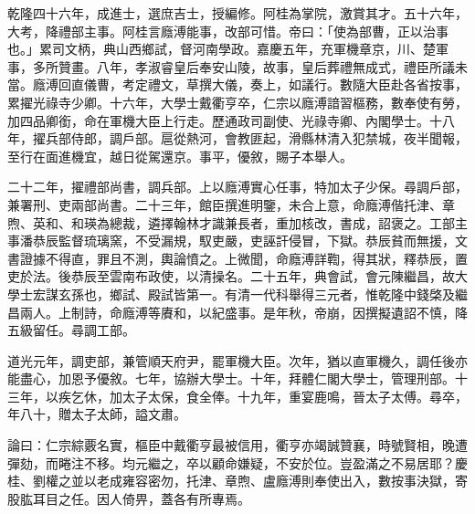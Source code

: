 \begin{pinyinscope}
乾隆四十六年，成進士，選庶吉士，授編修。阿桂為掌院，激賞其才。五十六年，大考，降禮部主事。阿桂言廕溥能事，改部可惜。帝曰：「使為部曹，正以治事也。」累司文柄，典山西鄉試，督河南學政。嘉慶五年，充軍機章京，川、楚軍事，多所贊畫。八年，孝淑睿皇后奉安山陵，故事，皇后葬禮無成式，禮臣所議未當。廕溥回直儀曹，考定禮文，草撰大儀，奏上，如議行。數隨大臣赴各省按事，累擢光祿寺少卿。十六年，大學士戴衢亨卒，仁宗以廕溥諳習樞務，數奉使有勞，加四品卿銜，命在軍機大臣上行走。歷通政司副使、光祿寺卿、內閣學士。十八年，擢兵部侍郎，調戶部。扈從熱河，會教匪起，滑縣林清入犯禁城，夜半聞報，至行在面進機宜，越日從駕還京。事平，優敘，賜子本舉人。

二十二年，擢禮部尚書，調兵部。上以廕溥實心任事，特加太子少保。尋調戶部，兼署刑、吏兩部尚書。二十三年，館臣撰進明鑒，未合上意，命廕溥偕托津、章煦、英和、和瑛為總裁，遴擇翰林才識兼長者，重加核改，書成，詔褒之。工部主事潘恭辰監督琉璃窯，不受漏規，馭吏嚴，吏誣訐侵冒，下獄。恭辰貧而無援，文書證據不得直，罪且不測，輿論憤之。上微聞，命廕溥詳鞫，得其狀，釋恭辰，置吏於法。後恭辰至雲南布政使，以清操名。二十五年，典會試，會元陳繼昌，故大學士宏謀玄孫也，鄉試、殿試皆第一。有清一代科舉得三元者，惟乾隆中錢棨及繼昌兩人。上制詩，命廕溥等賡和，以紀盛事。是年秋，帝崩，因撰擬遺詔不慎，降五級留任。尋調工部。

道光元年，調吏部，兼管順天府尹，罷軍機大臣。次年，猶以直軍機久，調任後亦能盡心，加恩予優敘。七年，協辦大學士。十年，拜體仁閣大學士，管理刑部。十三年，以疾乞休，加太子太保，食全俸。十九年，重宴鹿鳴，晉太子太傅。尋卒，年八十，贈太子太師，謚文肅。

論曰：仁宗綜覈名實，樞臣中戴衢亨最被信用，衢亨亦竭誠贊襄，時號賢相，晚遭彈劾，而睠注不移。均元繼之，卒以顧命嫌疑，不安於位。豈盈滿之不易居耶？慶桂、劉權之並以老成雍容密勿，托津、章煦、盧廕溥則奉使出入，數按事決獄，寄股肱耳目之任。因人倚畀，蓋各有所專焉。


\end{pinyinscope}